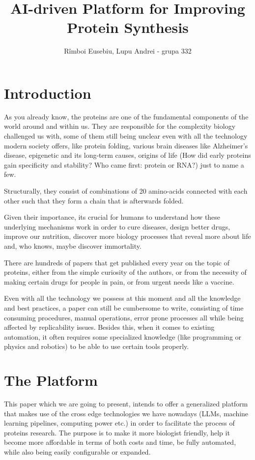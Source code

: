 \documentclass[10pt,a4paper]{article}
\title{AI-driven Platform for Improving Protein Synthesis}
\author{R\^{i}mboi Eusebiu, Lupu Andrei - grupa 332}
\begin{document}
	\maketitle
	\tableofcontents
	
	\section{Introduction}
	
	As you already know, the proteins are one of the fundamental components of the world around and within us. They are responsible for the complexity biology challenged us with, some of them still being unclear even with all the technology modern society offers, like protein folding, various brain diseases like Alzheimer’s disease, epigenetic and its long-term causes, origins of life (How did early proteins gain specificity and stability? Who came first: protein or RNA?) just to name a few.
	
	Structurally, they consist of combinations of 20 amino-acids connected with each other such that they form a chain that is afterwards folded.
	
	Given their importance, its crucial for humans to understand how these underlying mechanisms work in order to cure diseases, design better drugs, improve our nutrition, discover more biology processes that reveal more about life and, who knows, maybe discover immortality.
	
	There are hundreds of papers that get published every year on the topic of proteins, either from the simple curiosity of the authors, or from the necessity of making certain drugs for people in pain, or from urgent needs like a vaccine.
	
	Even with all the technology we possess at this moment and all the knowledge and best practices, a paper can still be cumbersome to write, consisting of time consuming procedures, manual operations, error prone processes all while being affected by replicability issues. Besides this, when it comes to existing automation, it often requires some specialized knowledge (like programming or physics and robotics) to be able to use certain tools properly.
	
	\section{The Platform}
	
	This paper which we are going to present, intends to offer a generalized platform that makes use of the cross edge technologies we have nowadays (LLMs, machine learning pipelines, computing power etc.) in order to facilitate the process of proteins research. The purpose is to make it more biologist friendly, help it become more affordable in terms of both costs and time, be fully automated, while also being easily configurable or expanded.
	
\end{document}
